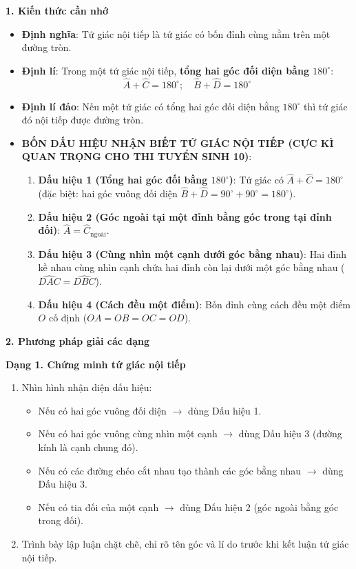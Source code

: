 \textbf{1. Kiến thức cần nhớ}
\begin{itemize}
\item \textbf{Định nghĩa}: Tứ giác nội tiếp là tứ giác có bốn đỉnh cùng nằm trên một đường tròn.
\item \textbf{Định lí}: Trong một tứ giác nội tiếp, \textbf{tổng hai góc đối diện bằng $180^\circ$}:
$$\boxed{\widehat{A} + \widehat{C} = 180^\circ;\quad \widehat{B} + \widehat{D} = 180^\circ}$$
\item \textbf{Định lí đảo}: Nếu một tứ giác có tổng hai góc đối diện bằng $180^\circ$ thì tứ giác đó nội tiếp được đường tròn.
\item \textbf{BỐN DẤU HIỆU NHẬN BIẾT TỨ GIÁC NỘI TIẾP (CỰC KÌ QUAN TRỌNG CHO THI TUYỂN SINH 10)}:
\begin{enumerate}
\item \textbf{Dấu hiệu 1 (Tổng hai góc đối bằng $180^\circ$)}: Tứ giác có $\widehat{A} + \widehat{C} = 180^\circ$ (đặc biệt: hai góc vuông đối diện $\widehat{B} + \widehat{D} = 90^\circ + 90^\circ = 180^\circ$).
\item \textbf{Dấu hiệu 2 (Góc ngoài tại một đỉnh bằng góc trong tại đỉnh đối)}: $\widehat{A} = \widehat{C}_{\text{ngoài}}$.
\item \textbf{Dấu hiệu 3 (Cùng nhìn một cạnh dưới góc bằng nhau)}: Hai đỉnh kề nhau cùng nhìn cạnh chứa hai đỉnh còn lại dưới một góc bằng nhau ($\widehat{DAC} = \widehat{DBC}$).
\item \textbf{Dấu hiệu 4 (Cách đều một điểm)}: Bốn đỉnh cùng cách đều một điểm $O$ cố định ($OA = OB = OC = OD$).
\end{enumerate}
\end{itemize}

\textbf{2. Phương pháp giải các dạng}

\textbf{Dạng 1. Chứng minh tứ giác nội tiếp}
\begin{enumerate}
\item Nhìn hình nhận diện dấu hiệu:
\begin{itemize}
\item Nếu có hai góc vuông đối diện $\rightarrow$ dùng Dấu hiệu 1.
\item Nếu có hai góc vuông cùng nhìn một cạnh $\rightarrow$ dùng Dấu hiệu 3 (đường kính là cạnh chung đó).
\item Nếu có các đường chéo cắt nhau tạo thành các góc bằng nhau $\rightarrow$ dùng Dấu hiệu 3.
\item Nếu có tia đối của một cạnh $\rightarrow$ dùng Dấu hiệu 2 (góc ngoài bằng góc trong đối).
\end{itemize}
\item Trình bày lập luận chặt chẽ, chỉ rõ tên góc và lí do trước khi kết luận tứ giác nội tiếp.
\end{enumerate}

